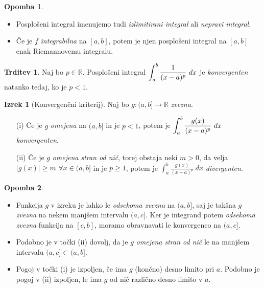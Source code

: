 \documentclass[11pt]{article}
\theoremstyle{definition}
\theoremstyle{definition}
\newtheorem{trditev}{Trditev}[section]
\theoremstyle{definition}
\newtheorem{izrek}{Izrek}[section]
\theoremstyle{theorem}
\newtheorem*{opomba}{Opomba}
\begin{document}
\begin{opomba}
~
\begin{itemize}
	
	\item Posplošeni integral imenujemo tudi \textit{izlimitirani integral} ali \textit{nepravi integral}.
	
	\item Če je $f$ \textit{integrabilna} na $[a, b]$, potem je njen posplošeni integral na $[a, b]$ enak Riemannovemu integralu.	
	
\end{itemize}
\end{opomba}
\vspace{0.5cm}

\begin{trditev}

Naj bo $p \in \mathbb{R}$. Posplošeni integral $\mathlarger{\int_a^b \frac{1}{(x-a)^p}~dx}$ je \textit{konvergenten} natanko tedaj, ko je $p<1$.

\end{trditev}
\vspace{0.5cm}

\begin{izrek}[Konvergenčni kriterij]

Naj bo $g:(a, b] \rightarrow \mathbb{R}$ \textit{zvezna}.
\begin{enumerate}
		
	\item[(i)] Če je $g$ \textit{omejena} na $(a, b]$ in je $p<1$, potem je $\mathlarger{\int_a^b \frac{g(x)}{(x-a)^p}~dx}$ \textit{konvergenten}.
	
	\item[(ii)] Če je $g$ \textit{omejena stran od nič}, torej obstaja neki $m > 0$, da velja $|g(x)| \geq m$ $\forall x \in (a, b]$ in je $p \geq 1$, potem je $\int_a^b \frac{g(x)}{(x-a)^p}~dx$ \textit{divergenten}.		
		
\end{enumerate}
\end{izrek}
\vspace{0.5cm}

\begin{opomba}
~
\begin{itemize}

	\item Funkcija $g$ v izreku je lahko le \textit{odsekoma zvezna} na $(a, b]$, saj je takšna $g$ \textit{zvezna} na nekem manjšem intervalu $(a, c]$. Ker je integrand potem \textit{odsekoma zvezna} funkcija na $[c, b]$, moramo obravnavati le konvergenco na $(a, c]$.
	
	\item Podobno je v točki (ii) dovolj, da je $g$ \textit{omejena stran od nič} le na manjšem intervalu $(a, c] \subset (a, b]$.
	
	\item Pogoj v točki (i) je izpoljen, če ima $g$ (končno) desno limito pri $a$. Podobno je pogoj v (ii) izpoljen, le ima $g$ od nič različno desno limito v $a$.

\end{itemize}
\end{opomba}
\vspace{0.5cm}
\end{document}
